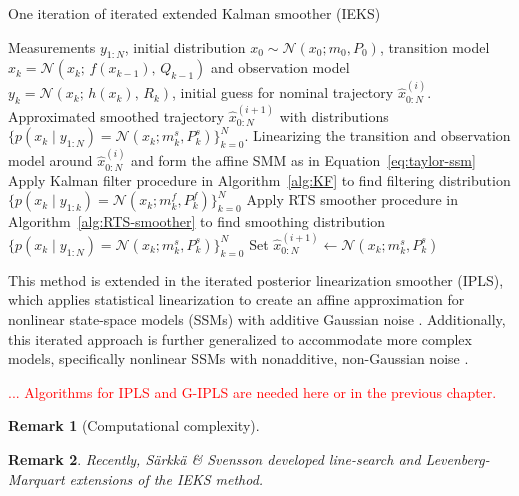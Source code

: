 \documentclass[dissertation,math,vertlayout,pdfa,colorlinks,nologo]{aaltoseries}
\newtheorem{remark}{Remark}
\newcommand{\trNonlinearAdditiveSSM}{x_k = \mathcal{N}(x_k; \,  f(x_{k-1}) , \, Q_{k-1})}
\newcommand{\obNonlinearAdditiveSSM}{y_k =  \mathcal{N}(x_k; \, h(x_k), \, R_k)}
\begin{document}
\begin{algorithm}[!htb]
    \caption{One iteration of iterated extended Kalman smoother (IEKS)}\label{alg:IEKS}
    \begin{algorithmic}[1]
        \renewcommand{\algorithmicrequire}{\textbf{Input:}}
        \renewcommand{\algorithmicensure}{\textbf{Output:}}
        \REQUIRE Measurements $y_{1:N}$, initial distribution $x_0 \sim \mathcal{N}(x_0; m_0, P_0)$, transition model $\trNonlinearAdditiveSSM$ and observation model $\obNonlinearAdditiveSSM$, initial guess for nominal trajectory $\hat{x}^{(i)}_{0:N}$.
        \ENSURE Approximated smoothed trajectory $\hat{x}^{(i + 1)}_{0:N}$ with distributions $\big\{p(x_k \mid y_{1: N})  = \mathcal{N}(x_k; m^s_k, P^s_k)\big\}_{k=0}^N$.
        \STATE Linearizing the transition and observation model around $\hat{x}^{(i)}_{0:N}$ and form the affine SMM as in Equation~\eqref{eq:taylor-ssm}
        \STATE Apply Kalman filter procedure in Algorithm~\ref{alg:KF} to find filtering distribution $\big\{p(x_k \mid y_{1: k})  = \mathcal{N}(x_k; m^f_k, P^f_k)\big\}_{k = 0}^N$
        \STATE Apply RTS smoother procedure in Algorithm~\ref{alg:RTS-smoother} to find smoothing distribution $\big\{p(x_k \mid y_{1: N})  = \mathcal{N}(x_k; m^s_k, P^s_k)\big\}_{k=0}^N$
        \STATE Set $\hat{x}^{(i + 1)}_{0:N} \gets \mathcal{N}(x_k; m^s_k, P^s_k)$
    \end{algorithmic}
\end{algorithm}
%
This method is extended in the iterated posterior linearization smoother (IPLS), which applies statistical linearization to create an affine approximation for nonlinear state-space models (SSMs) with additive Gaussian noise \citep{garcia2016iterated}. Additionally, this iterated approach is further generalized to accommodate more complex models, specifically nonlinear SSMs with nonadditive, non-Gaussian noise \citep{tronarp2018iterative}. 

\textcolor{red}{... Algorithms for IPLS and G-IPLS are needed here or in the previous chapter.}
\begin{remark}[Computational complexity]
    
\end{remark}
\begin{remark}
    Recently, S\"arkk\"a \& Svensson \citep{sarkka2020levenberg} developed line-search and Levenberg-Marquart extensions of the IEKS method.
\end{remark}
\end{document}
